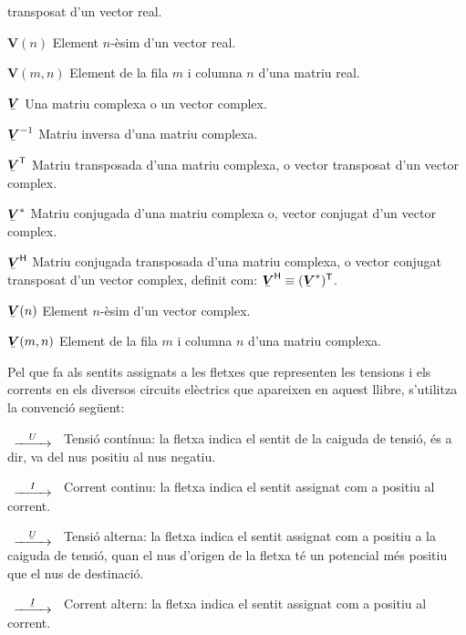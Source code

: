 \begin{list}{}
    transposat d'un vector real.
    \item[$\boldsymbol{V}(n)$] Element $n$-èsim d'un vector real.
    \item[$\boldsymbol{V}(m,n)$] Element de la fila $m$ i columna $n$ d'una matriu real.
    \item[$\mcmplx{V}$] Una matriu complexa o un vector complex.
    \item[$\mcmplx{V}^{-1}$] Matriu inversa d'una matriu complexa.
    \item[$\transp{\mcmplx{V}}$] Matriu transposada d'una matriu complexa, o vector
    transposat d'un vector complex.
    \item[$\mcmplx{V}^*$] Matriu conjugada d'una matriu complexa o, vector
    conjugat d'un vector complex.
    \item[$\hermit{V}$] Matriu conjugada transposada d'una matriu complexa, o vector
    conjugat transposat d'un vector complex, definit com: $\hermit{V} \equiv
    \transp{(\mcmplx{V}^*)}$.
    \item[$\mcmplx{V}(n)$] Element $n$-èsim d'un vector complex.
    \item[$\mcmplx{V}(m,n)$] Element de la fila $m$ i columna $n$ d'una matriu complexa.
\end{list}

Pel que fa als sentits assignats a les fletxes que representen les
tensions i els corrents en els diversos circuits elèctrics que
apareixen en aquest llibre, s'utilitza la convenció següent:

\begin{list}{}
{\setlength{\labelwidth}{15mm} \setlength{\leftmargin}{20mm}
\setlength{\labelsep}{5mm}}
    \item[$\begin{CD} @>U>> \end{CD}$] Tensió contínua: la fletxa indica el sentit
    de la caiguda de tensió, és a dir, va del nus positiu al nus negatiu.
    \item[$\begin{CD} @>I>> \end{CD}$] Corrent
    continu: la fletxa indica el sentit  assignat com a positiu al corrent.
    \item[$\begin{CD} @>\cmplx{U}>> \end{CD}$] Tensió alterna: la fletxa indica el
    sentit assignat com a positiu a la caiguda de tensió, quan el nus d'origen de la fletxa
    té un potencial  més positiu que el nus de destinació.
    \item[$\begin{CD} @>\cmplx{I}>> \end{CD}$] Corrent altern: la fletxa
    indica el sentit  assignat com a positiu al corrent.
\end{list}

